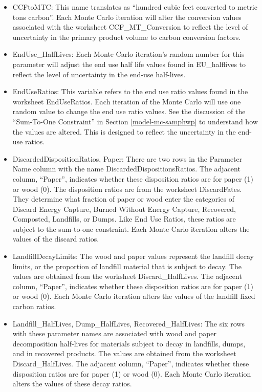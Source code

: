 \documentclass[
  openany]{book}
\begin{document}
\begin{itemize}
  \begin{itemize}
  \item
    CCFtoMTC: This name translates as ``hundred cubic feet converted to metric tons carbon''. Each Monte Carlo iteration will alter the conversion values associated with the worksheet CCF\_MT\_Conversion to reflect the level of uncertainty in the primary product volume to carbon conversion factors.
  \item
    EndUse\_HalfLives: Each Monte Carlo iteration's random number for this parameter will adjust the end use half life values found in EU\_halflives to reflect the level of uncertainty in the end-use half-lives.
  \item
    EndUseRatios: This variable refers to the end use ratio values found in the worksheet EndUseRatios. Each iteration of the Monte Carlo will use one random value to change the end use ratio values. See the discussion of the ``Sum-To-One Constraint'' in Section \ref{model-mc-samphwp} to understand how the values are altered. This is designed to reflect the uncertainty in the end-use ratios.
  \item
    DiscardedDispositionRatios, Paper: There are two rows in the Parameter Name column with the name DiscardedDispositionsRatios. The adjacent column, ``Paper'', indicates whether these disposition ratios are for paper (1) or wood (0). The disposition ratios are from the worksheet DiscardFates. They determine what fraction of paper or wood enter the categories of Discard Energy Capture, Burned Without Energy Capture, Recovered, Composted, Landfills, or Dumps. Like End Use Ratios, these ratios are subject to the sum-to-one constraint. Each Monte Carlo iteration alters the values of the discard ratios.
  \item
    LandfillDecayLimits: The wood and paper values represent the landfill decay limits, or the proportion of landfill material that is subject to decay. The values are obtained from the worksheet Discard\_HalfLives. The adjacent column, ``Paper'', indicates whether these disposition ratios are for paper (1) or wood (0). Each Monte Carlo iteration alters the values of the landfill fixed carbon ratios.
  \item
    Landfill\_HalfLives, Dump\_HalfLives, Recovered\_HalfLives: The six rows with these parameter names are associated with wood and paper decomposition half-lives for materials subject to decay in landfills, dumps, and in recovered products. The values are obtained from the worksheet Discard\_HalfLives. The adjacent column, ``Paper'', indicates whether these disposition ratios are for paper (1) or wood (0). Each Monte Carlo iteration alters the values of these decay ratios.

\end{itemize}
\end{itemize}
\end{document}
